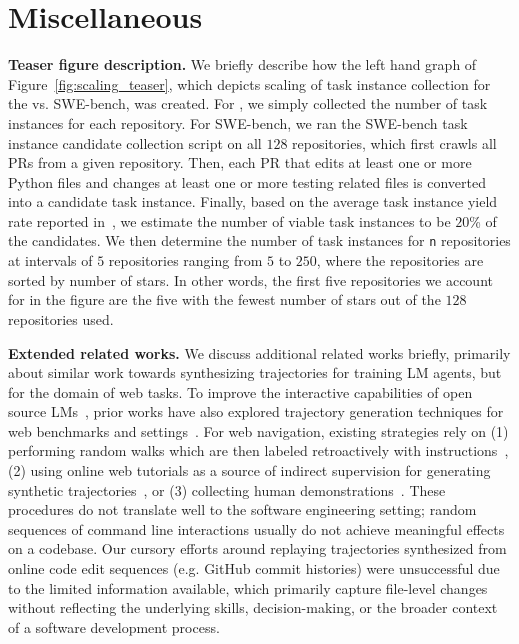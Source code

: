 \section{Miscellaneous}
\label{appx:misc}

\textbf{Teaser figure description.} We briefly describe how the left hand graph of Figure~\ref{fig:scaling_teaser}, which depicts scaling of task instance collection for the \bugs{} vs. SWE-bench, was created.
For \bugs{}, we simply collected the number of task instances for each repository.
For SWE-bench, we ran the SWE-bench task instance candidate collection script on all $128$ repositories, which first crawls all PRs from a given repository.
Then, each PR that edits at least one or more Python files and changes at least one or more testing related files is converted into a candidate task instance.
Finally, based on the average task instance yield rate reported in~\citet{jimenez_swe-bench_2024}, we estimate the number of viable task instances to be $20$\% of the candidates.
We then determine the number of task instances for \texttt{n} repositories at intervals of $5$ repositories ranging from $5$ to $250$, where the repositories are sorted by number of stars.
In other words, the first five repositories we account for in the figure are the five with the fewest number of stars out of the $128$ repositories used.

\textbf{Extended related works.}
We discuss additional related works briefly, primarily about similar work towards synthesizing trajectories for training LM agents, but for the domain of web tasks.
To improve the interactive capabilities of open source LMs~\citep{chen_fireact_2023}, prior works have also explored trajectory generation techniques for web benchmarks and settings~\citep{xie_osworld_2024,yao_webshop_2023,zhou_webarena_2024}.
For web navigation, existing strategies rely on (1) performing random walks which are then labeled retroactively with instructions~\citep{xiang_language_2023,murty_nnetscape_2024}, (2) using online web tutorials as a source of indirect supervision for generating synthetic trajectories~\citep{ou_synatra_2024}, or (3) collecting human demonstrations~\citep{shen2024scribeagentspecializedwebagents,xu_agenttrek_2024}.
These procedures do not translate well to the software engineering setting; random sequences of command line interactions usually do not achieve meaningful effects on a codebase.
Our cursory efforts around replaying trajectories synthesized from online code edit sequences (e.g. GitHub commit histories) were unsuccessful due to the limited information available, which primarily capture file-level changes without reflecting the underlying skills, decision-making, or the broader context of a software development process.

